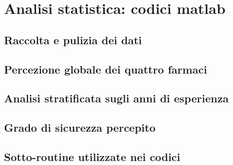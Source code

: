 \chapter{Analisi statistica: codici matlab}

\section{Raccolta e pulizia dei dati}
\label{code:wrangling}


\section{Percezione globale dei quattro farmaci}
\label{code:quality-global}


\section{Analisi stratificata sugli anni di esperienza}
\label{code:quality-strati}


\section{Grado di sicurezza percepito}
\label{code:safety}


\newpage

\section{Sotto-routine utilizzate nei codici}
\label{code:subroutines}


